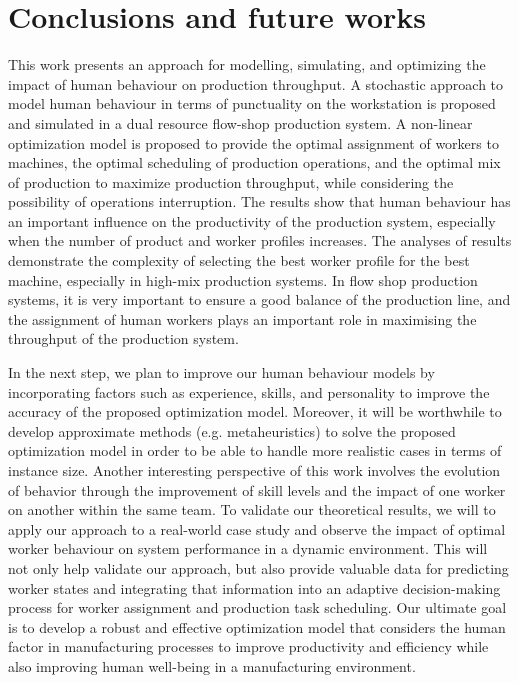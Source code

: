 \documentclass[review,12pt, 3p, times]{elsarticle}
\begin{document}
\section{Conclusions and future works  }\label{sec:conc3}  
This work presents an approach for modelling, simulating, and optimizing the impact of human behaviour on production throughput. A stochastic approach to model human behaviour in terms of punctuality on the workstation is proposed and simulated in a dual resource flow-shop production system. A non-linear optimization model is proposed to provide the optimal assignment of workers to machines, the optimal scheduling of production operations, and the optimal mix of production to maximize production throughput, while considering the possibility of operations interruption. The results show that human behaviour has an important influence on the productivity of the production system, especially when the number of product and worker profiles increases. The analyses of results demonstrate the complexity of selecting the best worker profile for the best machine, especially in high-mix production systems. In flow shop production systems, it is very important to ensure a good balance of the production line, and the assignment of human workers plays an important role in maximising the throughput of the production system.  
	
In the next step, we plan to improve our human behaviour models by incorporating factors such as experience, skills, and personality to improve the accuracy of the proposed optimization model.
Moreover, it will be worthwhile to develop approximate methods (e.g. metaheuristics) to solve the proposed optimization model in order to be able to handle more realistic cases in terms of instance size.
Another interesting perspective of this work involves the evolution of behavior through the improvement of skill levels and the impact of one worker on another within the same team.
To validate our theoretical results, we will to apply our approach to a real-world case study and observe the impact of optimal worker behaviour on system performance in a dynamic environment. This will not only help validate our approach, but also provide valuable data for predicting worker states and integrating that information into an adaptive decision-making process for worker assignment and production task scheduling. Our ultimate goal is to develop a robust and effective optimization model that considers the human factor in manufacturing processes to improve productivity and efficiency while also improving human well-being in a manufacturing environment.
	
\end{document}
